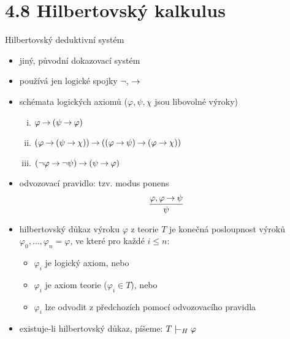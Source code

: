 \documentclass{beamer}
\begin{document}
\section{4.8 Hilbertovský kalkulus}


\begin{frame}{Hilbertovský deduktivní systém}

    \begin{itemize}
        \item jiný, původní dokazovací systém 
        \item používá jen logické spojky $\neg$, $\mathbin{\rightarrow}$
        \item \alert{schémata logických axiomů} ($\varphi,\psi,\chi$ jsou libovolné výroky)
        \begin{enumerate}[(i)]
            \item $\varphi \mathbin{\rightarrow} (\psi \mathbin{\rightarrow} \varphi)$
            \item $(\varphi\mathbin{\rightarrow} (\psi \mathbin{\rightarrow} \chi))\mathbin{\rightarrow} ((\varphi \mathbin{\rightarrow} \psi)\mathbin{\rightarrow}(\varphi \mathbin{\rightarrow} \chi))$
            \item $(\neg \varphi \mathbin{\rightarrow} \neg \psi)\mathbin{\rightarrow}(\psi \mathbin{\rightarrow} \varphi)$
        \end{enumerate}
        \item \alert{odvozovací pravidlo}: tzv. \alert{modus ponens}
                $$\frac{\varphi, \varphi \mathbin{\rightarrow} \psi}{\psi}$$       
        \item \alert{hilbertovský důkaz} výroku $\varphi$ z teorie $T$ je \alert{konečná} posloupnost výroků $\varphi_0, \dots, \varphi_n=\varphi$, ve které pro každé $i\le n$:
        \begin{itemize}
        \item $\varphi_i$ je \alert{logický axiom}, nebo
        \item $\varphi_i$ je \alert{axiom teorie} ($\varphi_i \in T$), nebo
        \item $\varphi_i$ lze odvodit z předchozích pomocí \alert{odvozovacího pravidla}
        \end{itemize}
        \item existuje-li hilbertovský důkaz, píšeme: \alert{$T\proves_H\varphi$}
    \end{itemize}

\end{frame}
\end{document}

